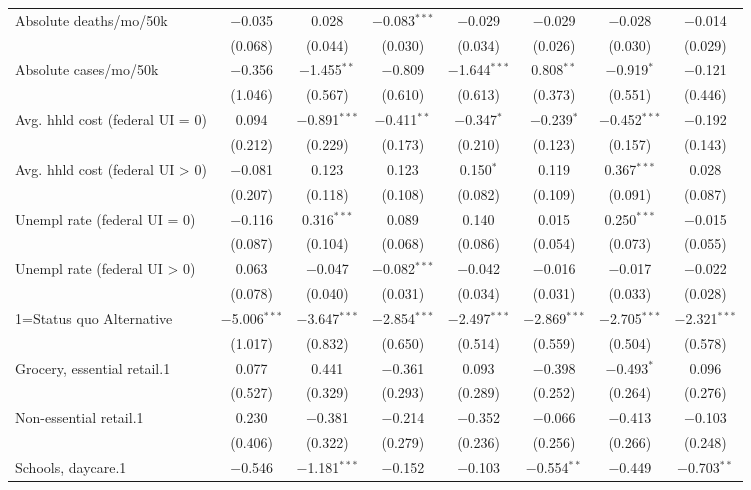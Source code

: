 \begin{table}[!htbp]
\begin{tabular}{@{\extracolsep{5pt}}lccccccc}
 Absolute deaths/mo/50k & $-$0.035 & 0.028 & $-$0.083$^{***}$ & $-$0.029 & $-$0.029 & $-$0.028 & $-$0.014 \\ 
  & (0.068) & (0.044) & (0.030) & (0.034) & (0.026) & (0.030) & (0.029) \\ 
  Absolute cases/mo/50k & $-$0.356 & $-$1.455$^{**}$ & $-$0.809 & $-$1.644$^{***}$ & 0.808$^{**}$ & $-$0.919$^{*}$ & $-$0.121 \\ 
  & (1.046) & (0.567) & (0.610) & (0.613) & (0.373) & (0.551) & (0.446) \\ 
  Avg. hhld cost (federal UI = 0) & 0.094 & $-$0.891$^{***}$ & $-$0.411$^{**}$ & $-$0.347$^{*}$ & $-$0.239$^{*}$ & $-$0.452$^{***}$ & $-$0.192 \\ 
  & (0.212) & (0.229) & (0.173) & (0.210) & (0.123) & (0.157) & (0.143) \\ 
  Avg. hhld cost (federal UI > 0) & $-$0.081 & 0.123 & 0.123 & 0.150$^{*}$ & 0.119 & 0.367$^{***}$ & 0.028 \\ 
  & (0.207) & (0.118) & (0.108) & (0.082) & (0.109) & (0.091) & (0.087) \\ 
  Unempl rate (federal UI = 0) & $-$0.116 & 0.316$^{***}$ & 0.089 & 0.140 & 0.015 & 0.250$^{***}$ & $-$0.015 \\ 
  & (0.087) & (0.104) & (0.068) & (0.086) & (0.054) & (0.073) & (0.055) \\ 
  Unempl rate (federal UI > 0) & 0.063 & $-$0.047 & $-$0.082$^{***}$ & $-$0.042 & $-$0.016 & $-$0.017 & $-$0.022 \\ 
  & (0.078) & (0.040) & (0.031) & (0.034) & (0.031) & (0.033) & (0.028) \\ 
  1=Status quo Alternative & $-$5.006$^{***}$ & $-$3.647$^{***}$ & $-$2.854$^{***}$ & $-$2.497$^{***}$ & $-$2.869$^{***}$ & $-$2.705$^{***}$ & $-$2.321$^{***}$ \\ 
  & (1.017) & (0.832) & (0.650) & (0.514) & (0.559) & (0.504) & (0.578) \\ 
  Grocery, essential retail.1 & 0.077 & 0.441 & $-$0.361 & 0.093 & $-$0.398 & $-$0.493$^{*}$ & 0.096 \\ 
  & (0.527) & (0.329) & (0.293) & (0.289) & (0.252) & (0.264) & (0.276) \\ 
  Non-essential retail.1 & 0.230 & $-$0.381 & $-$0.214 & $-$0.352 & $-$0.066 & $-$0.413 & $-$0.103 \\ 
  & (0.406) & (0.322) & (0.279) & (0.236) & (0.256) & (0.266) & (0.248) \\ 
  Schools, daycare.1 & $-$0.546 & $-$1.181$^{***}$ & $-$0.152 & $-$0.103 & $-$0.554$^{**}$ & $-$0.449 & $-$0.703$^{**}$ \\ 

\end{tabular}
\end{table}
